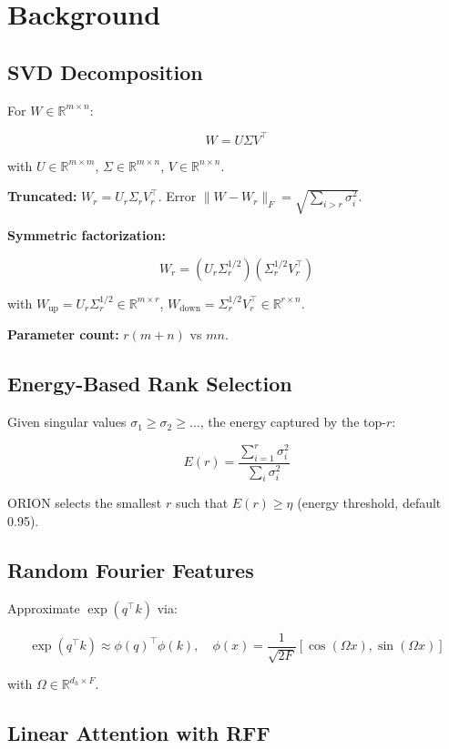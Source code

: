 
\section{Background}

\subsection{SVD Decomposition}

For $W \in \mathbb{R}^{m \times n}$:

\[
W = U \Sigma V^\top
\tag{3.1}
\]

with $U \in \mathbb{R}^{m \times m}$, $\Sigma \in \mathbb{R}^{m \times n}$, 
$V \in \mathbb{R}^{n \times n}$.

\textbf{Truncated:} $W_r = U_r \Sigma_r V_r^\top$. Error $\|W - W_r\|_F = \sqrt{\sum_{i > r} \sigma_i^2}$.

\textbf{Symmetric factorization:}

\[
W_r = (U_r \Sigma_r^{1/2})(\Sigma_r^{1/2} V_r^\top)
\tag{3.2}
\]

with $W_\text{up} = U_r \Sigma_r^{1/2} \in \mathbb{R}^{m \times r}$, 
$W_\text{down} = \Sigma_r^{1/2} V_r^\top \in \mathbb{R}^{r \times n}$.

\textbf{Parameter count:} $r(m + n)$ vs $mn$.

\subsection{Energy-Based Rank Selection}

Given singular values $\sigma_1 \geq \sigma_2 \geq \dots$, the energy 
captured by the top-$r$:

\[
E(r) = \frac{\sum_{i=1}^{r} \sigma_i^2}{\sum_i \sigma_i^2}
\tag{3.3}
\]

ORION selects the smallest $r$ such that $E(r) \geq \eta$ (energy threshold, 
default 0.95).

\subsection{Random Fourier Features}

Approximate $\exp(q^\top k)$ via:

\[
\exp(q^\top k) \approx \phi(q)^\top \phi(k), \quad
\phi(x) = \frac{1}{\sqrt{2F}} [\cos(\Omega x), \sin(\Omega x)]
\tag{3.4}
\]

with $\Omega \in \mathbb{R}^{d_h \times F}$.

\subsection{Linear Attention with RFF}

